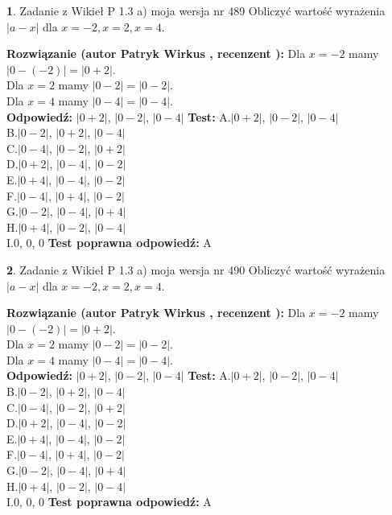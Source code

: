 \documentclass[12pt, a4paper]{article}
\theoremstyle{definition} %
\newtheorem{zad}{}
\newcommand{\zadStart}[1]{\begin{zad}#1\newline}
\newcommand{\zadStop}{\end{zad}}
\newcommand{\rozwStart}[2]{\noindent \textbf{Rozwiązanie (autor #1 , recenzent #2): }\newline}
\newcommand{\rozwStop}{\newline}
\newcommand{\odpStart}{\noindent \textbf{Odpowiedź:}\newline}
\newcommand{\odpStop}{\newline}
\newcommand{\testStart}{\noindent \textbf{Test:}\newline}
\newcommand{\testStop}{\newline}
\newcommand{\kluczStart}{\noindent \textbf{Test poprawna odpowiedź:}\newline}
\newcommand{\kluczStop}{\newline}
\begin{document}
\zadStart{Zadanie z Wikieł P 1.3 a) moja wersja nr 489}
Obliczyć wartość wyrażenia $|a - x|$ dla $x=-2,x=2,x=4$.
\zadStop
\rozwStart{Patryk Wirkus}{}
Dla $x = -2$ mamy $|0 - (-2)| = |0 + 2|$.\\
Dla $x = 2$ mamy $|0 - 2| = |0 - 2|$.\\
Dla $x = 4$ mamy $|0 - 4| = |0 - 4|$.\\
\rozwStop
\odpStart
$|0 + 2|$, $|0 - 2|$, $|0 - 4|$
\odpStop
\testStart
A.$|0 + 2|$, $|0 - 2|$, $|0 - 4|$\\
B.$|0 - 2|$, $|0 + 2|$, $|0 - 4|$\\
C.$|0 - 4|$, $|0 - 2|$, $|0 + 2|$\\
D.$|0 + 2|$, $|0 - 4|$, $|0 - 2|$\\
E.$|0 + 4|$, $|0 - 4|$, $|0 - 2|$\\
F.$|0 - 4|$, $|0 + 4|$, $|0 - 2|$\\
G.$|0 - 2|$, $|0 - 4|$, $|0 + 4|$\\
H.$|0 + 4|$, $|0 - 2|$, $|0 - 4|$\\
I.$0$, $0$, $0$
\testStop
\kluczStart
A
\kluczStop



\zadStart{Zadanie z Wikieł P 1.3 a) moja wersja nr 490}
Obliczyć wartość wyrażenia $|a - x|$ dla $x=-2,x=2,x=4$.
\zadStop
\rozwStart{Patryk Wirkus}{}
Dla $x = -2$ mamy $|0 - (-2)| = |0 + 2|$.\\
Dla $x = 2$ mamy $|0 - 2| = |0 - 2|$.\\
Dla $x = 4$ mamy $|0 - 4| = |0 - 4|$.\\
\rozwStop
\odpStart
$|0 + 2|$, $|0 - 2|$, $|0 - 4|$
\odpStop
\testStart
A.$|0 + 2|$, $|0 - 2|$, $|0 - 4|$\\
B.$|0 - 2|$, $|0 + 2|$, $|0 - 4|$\\
C.$|0 - 4|$, $|0 - 2|$, $|0 + 2|$\\
D.$|0 + 2|$, $|0 - 4|$, $|0 - 2|$\\
E.$|0 + 4|$, $|0 - 4|$, $|0 - 2|$\\
F.$|0 - 4|$, $|0 + 4|$, $|0 - 2|$\\
G.$|0 - 2|$, $|0 - 4|$, $|0 + 4|$\\
H.$|0 + 4|$, $|0 - 2|$, $|0 - 4|$\\
I.$0$, $0$, $0$
\testStop
\kluczStart
A
\kluczStop
\end{document}
